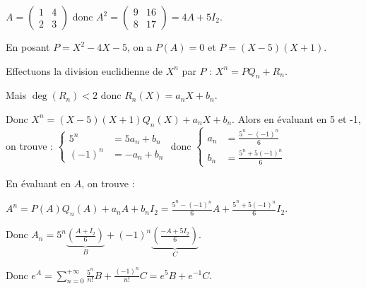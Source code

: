 \begin{exemple}
    \lvspace $A = \begin{pmatrix}
        1 & 4 \\
        2 & 3
    \end{pmatrix}$ donc $A^2 = \begin{pmatrix}
        9 & 16 \\
        8 & 17
    \end{pmatrix} = 4A + 5 I_2$. 

    En posant $P = X^2 - 4X - 5$, on a $P(A) = 0$ et $P = (X - 5)(X + 1)$.

    Effectuons la division euclidienne de $X^n$ par $P$ : $X^n = P Q_n + R_n$. 
    
    Mais $\deg(R_n) < 2$ donc $R_n(X) = a_n X + b_n$. 

    Donc $X^n = (X - 5)(X + 1) Q_n(X) + a_n X + b_n$. Alors en évaluant en 5 et -1, on trouve :
    $\left\{ \begin{array}{rl}
        5^n & = 5 a_n + b_n \\
        (-1)^n & = -a_n + b_n
    \end{array} \right.$ donc $\left\{ \begin{array}{rl}
        a_n & = \frac{5^n - (-1)^n}{6} \\
        b_n & = \frac{5^{n} + 5(-1)^n}{6}
    \end{array} \right.$

    En évaluant en $A$, on trouve :
    
    $A^n = P(A) Q_n(A) + a_n A + b_n I_2 = \frac{5^n - (-1)^n}{6} A + \frac{5^n + 5(-1)^n}{6} I_2$.

    Donc $A_n = 5^n \underbrace{\left( \frac{A + I_2} 6 \right)}_{B} + (-1)^n \underbrace{\left( \frac{-A + 5 I_2}{6} \right)}_{C}$.

    Donc $\displaystyle e^A = \sum_{n = 0}^{+\infty} \frac{5^n}{n!}B + \frac{(-1)^n}{n!} C = e^5 B + e^{-1} C$. \\
\end{exemple}

